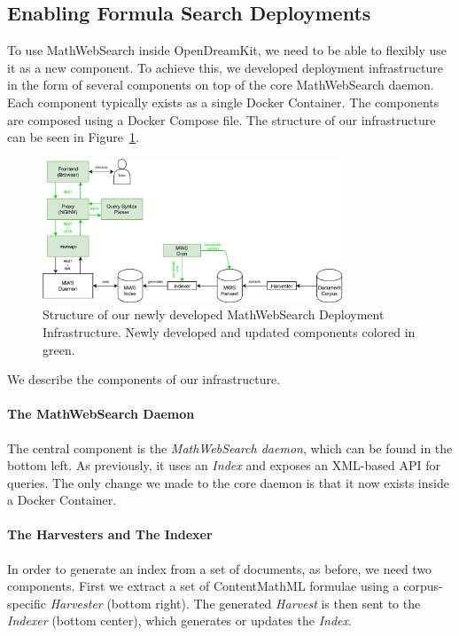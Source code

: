 
\subsection{Enabling Formula Search Deployments}

To use MathWebSearch inside OpenDreamKit, we need to be able to flexibly use it as a new component. 
To achieve this, we developed deployment infrastructure in the form of several components on top of the core MathWebSearch daemon. 
Each component typically exists as a single Docker Container. 
The components are composed using a Docker Compose file.
The structure of our infrastructure can be seen in Figure~\ref{fig:mwsdeployment}. 

\begin{figure}[ht]
  \includegraphics[width=0.8\textwidth]{mws_layout.pdf}
  \caption{Structure of our newly developed MathWebSearch Deployment Infrastructure. Newly developed and updated components colored in green. }\label{fig:mwsdeployment}
\end{figure}

We describe the components of our infrastructure. 

\paragraph{The MathWebSearch Daemon}
The central component is the \textit{MathWebSearch daemon}, which can be found in the bottom left. 
As previously, it uses an \textit{Index} and exposes an XML-based API for queries. 
The only change we made to the core daemon is that it now exists inside a Docker Container. 

\paragraph{The Harvesters and The Indexer}
In order to generate an index from a set of documents, as before, we need two components. 
First we extract a set of ContentMathML formulae using a corpus-specific \textit{Harvester} (bottom right). 
The generated \textit{Harvest} is then sent to the \textit{Indexer} (bottom center), which generates or updates the \textit{Index}. 


